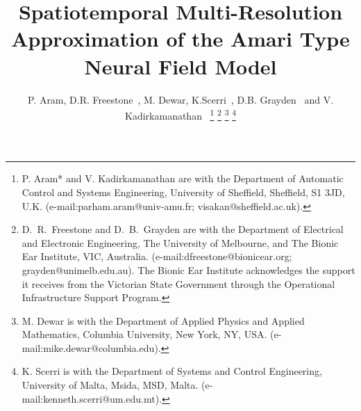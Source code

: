 \documentclass[11pt,draftcls,onecolumn,peerreview]{IEEEtran}
\begin{document}
%
\title{Spatiotemporal Multi-Resolution Approximation of the Amari Type Neural Field Model}


\author{P. Aram, D.R. Freestone~, M. Dewar, K.Scerri~, D.B. Grayden~ and V. Kadirkamanathan~ %
\thanks{P. Aram* and V. Kadirkamanathan are with the Department of Automatic Control and Systems Engineering, University of Sheffield, Sheffield, S1 3JD, U.K. (e-mail:parham.aram@univ-amu.fr; visakan@sheffield.ac.uk).}%
\thanks{D.\ R.\ Freestone and D.\ B.\ Grayden are with the Department
of Electrical and Electronic Engineering, The University of Melbourne, and The Bionic Ear Institute, VIC, Australia. (e-mail:dfreestone@bionicear.org; grayden@unimelb.edu.au). The Bionic Ear Institute acknowledges the support it receives from the Victorian State Government through the Operational Infrastructure Support Program.}
\thanks{M. Dewar is with the Department of Applied Physics and Applied Mathematics, Columbia University, New York, NY, USA. (e-mail:mike.dewar@columbia.edu).}
\thanks{K. Scerri is with the Department of Systems and Control Engineering, University
of Malta, Msida, MSD, Malta. (e-mail:kenneth.scerri@um.edu.mt).}}



% 
 \ifCLASSOPTIONpeerreview
\else
\fi


\maketitle
\end{document}
